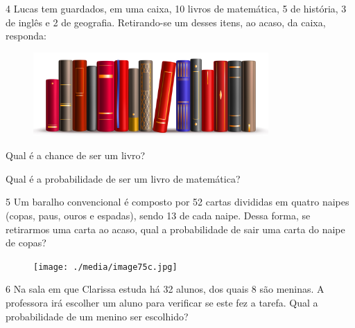 
\num{4} Lucas tem guardados, em uma caixa, 10 livros de matemática, 5 de história, 3 de inglês e
2 de geografia. Retirando-se um desses itens, ao acaso, da caixa,
responda:

\begin{figure}[htpb!]
\centering
\includegraphics[width=0.8\textwidth]{./media/image75b.jpg}
\end{figure}

\begin{escolha}
\item Qual é a chance de ser um livro?

\item  Qual é a probabilidade de ser um livro de matemática?
\end{escolha}

\num{5} Um baralho convencional é composto por 52 cartas divididas em quatro
naipes (copas, paus, ouros e espadas), sendo 13 de cada naipe. Dessa
forma, se retirarmos uma carta ao acaso, qual a probabilidade de sair
uma carta do naipe de copas?

\begin{figure}[htpb!]
\centering
\texttt{[image: ./media/image75c.jpg]}
\end{figure}


\num{6} Na sala em que Clarissa estuda há 32 alunos, dos quais 8 são meninas. A
professora irá escolher um aluno para verificar se este fez a tarefa.
Qual a probabilidade de um menino ser escolhido?

